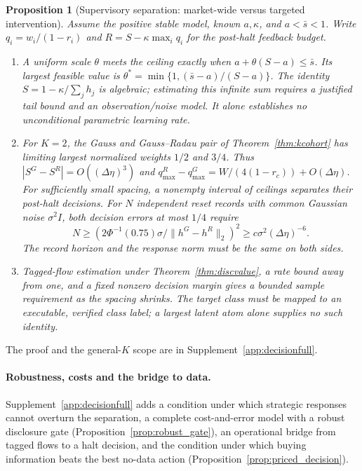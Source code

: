 \documentclass[12pt]{article}
\newtheorem{proposition}[theorem]{Proposition}
\theoremstyle{definition}
\theoremstyle{remark}
\begin{document}
\begin{proposition}[Supervisory separation: market-wide versus targeted intervention]\label{prop:target}
Assume the positive stable model, known $a,\kappa$, and $a<\bar s<1$. Write $q_i=w_i/(1-r_i)$ and $R=S-\kappa\max_iq_i$ for the post-halt feedback budget.
\begin{enumerate}[label=(\roman*),itemsep=1pt]
\item A uniform scale $\theta$ meets the ceiling exactly when $a+\theta(S-a)\le\bar s$. Its largest feasible value is $\theta^*=\min\{1,(\bar s-a)/(S-a)\}$. The identity $S=1-\kappa/\sum_jh_j$ is algebraic; estimating this infinite sum requires a justified tail bound and an observation/noise model. It alone establishes no unconditional parametric learning rate.
\item For $K=2$, the Gauss and Gauss--Radau pair of Theorem~\ref{thm:kcohort} has limiting largest normalized weights $1/2$ and $3/4$. Thus $|S^G-S^R|=O((\Delta\eta)^3)$ and $q^R_{\max}-q^G_{\max}=W/(4(1-r_c))+O(\Delta\eta)$. For sufficiently small spacing, a nonempty interval of ceilings separates their post-halt decisions. For $N$ independent reset records with common Gaussian noise $\sigma^2 I$, both decision errors at most $1/4$ require
\[
 N\ge (2\Phi^{-1}(0.75)\sigma/\|h^G-h^R\|_2)^2
 \ge c\sigma^2(\Delta\eta)^{-6}.
\]
The record horizon and the response norm must be the same on both sides.
\item Tagged-flow estimation under Theorem~\ref{thm:discvalue}, a rate bound away from one, and a fixed nonzero decision margin gives a bounded sample requirement as the spacing shrinks. The target class must be mapped to an executable, verified class label; a largest latent atom alone supplies no such identity.
\end{enumerate}
\end{proposition}
The proof and the general-$K$ scope are in Supplement~\ref{app:decisionfull}.

\paragraph{Robustness, costs and the bridge to data.} Supplement~\ref{app:decisionfull} adds a condition under which strategic responses cannot overturn the separation, a complete cost-and-error model with a robust disclosure gate (Proposition~\ref{prop:robust_gate}), an operational bridge from tagged flows to a halt decision, and the condition under which buying information beats the best no-data action (Proposition~\ref{prop:priced_decision}).
\end{document}

